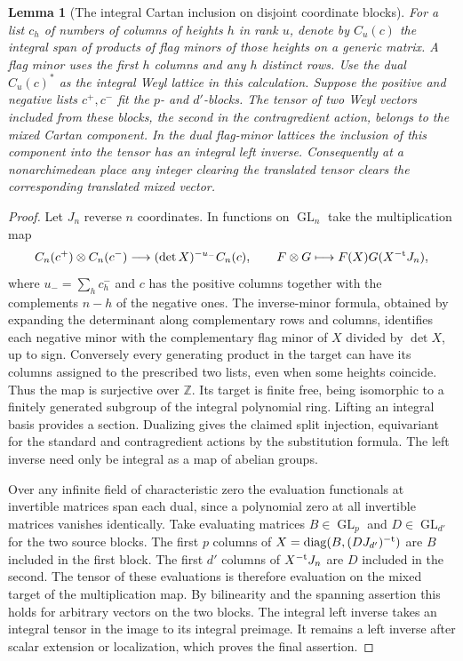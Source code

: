 \documentclass[a4paper,11pt]{article}
\newtheorem{lemma}[proposition]{Lemma}
\theoremstyle{definition}
\theoremstyle{remark}
\newcommand{\ZZ}{\mathbb Z}\newcommand{\ord}{\operatorname{ord}}
\numberwithin{equation}{section}
\newcommand{\GL}{\operatorname{GL}}
\begin{document}
\begin{lemma}[The integral Cartan inclusion on disjoint coordinate blocks]
\leavevmode\label{lem:dualcartan811}
For a list \(c_h\) of numbers of columns of heights \(h\)
in rank \(u\), denote by \(C_u(c)\) the integral span of
products of flag minors of those heights on a generic matrix.
A flag minor uses the first \(h\) columns and any \(h\)
distinct rows. Use the dual \(C_u(c)^*\) as the integral
Weyl lattice in this calculation. Suppose the positive
and negative lists \(c^+,c^-\) fit the \(p\)- and \(d'\)-blocks.
The tensor of two Weyl vectors included from these blocks,
the second in the contragredient action, belongs to the
mixed Cartan component. In the dual flag-minor lattices
the inclusion of this component into the tensor has an
integral left inverse. Consequently at a nonarchimedean
place any integer clearing the translated tensor clears
the corresponding translated mixed vector.
\end{lemma}
\begin{proof}
Let \(J_n\) reverse \(n\) coordinates. In functions on
\(\GL_n\) take the multiplication map
\[
 C_n(c^+)\otimes C_n(c^-)\longrightarrow
       (\det X)^{-u_-}C_n(c),\qquad
              F\otimes G\longmapsto F(X)G(X^{-{\rm t}}J_n),
\]
where \(u_-=\sum_h c_h^-\) and \(c\) has the positive columns
together with the complements \(n-h\) of the negative ones.
The inverse-minor formula, obtained by expanding the
determinant along complementary rows and columns, identifies
each negative minor with the complementary flag minor of
\(X\) divided by \(\det X\), up to sign. Conversely every
generating product in the target can have its columns
assigned to the prescribed two lists, even when some heights
coincide. Thus the map is surjective over \(\ZZ\).
Its target is finite free, being isomorphic to a finitely
generated subgroup of the integral polynomial ring. Lifting
an integral basis provides a section. Dualizing gives the
claimed split injection, equivariant for the standard and
contragredient actions by the substitution formula. The
left inverse need only be integral as a map of abelian groups.

Over any infinite field of characteristic zero the evaluation
functionals at invertible matrices span each dual, since
a polynomial zero at all invertible matrices vanishes
identically. Take evaluating matrices \(B\in\GL_p\) and
\(D\in\GL_{d'}\) for the two source blocks. The first \(p\)
columns of \(X=\operatorname{diag}(B,(D J_{d'})^{-{\rm t}})\)
are \(B\) included in the first block. The first \(d'\)
columns of \(X^{-{\rm t}}J_n\) are \(D\) included in the
second. The tensor of these evaluations is therefore
evaluation on the mixed target of the multiplication map.
By bilinearity and the spanning assertion this holds for
arbitrary vectors on the two blocks. The integral left
inverse takes an integral tensor in the image to its
integral preimage. It remains a left inverse after scalar
extension or localization, which proves the final assertion.
\end{proof}
\end{document}
